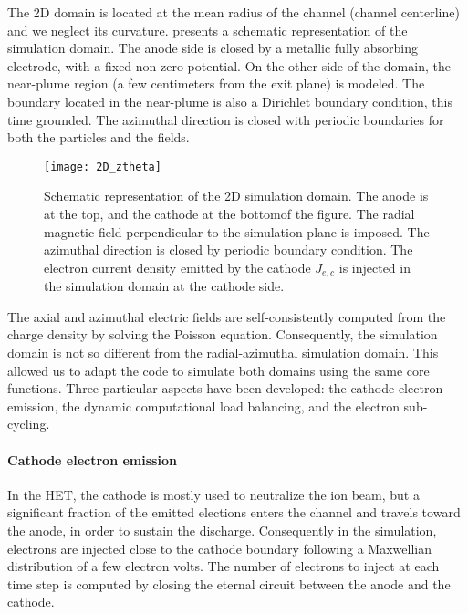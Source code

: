The \ac{2D} \ztheta domain is located at the mean radius of the channel (channel centerline) and we neglect its curvature.
 presents a schematic representation of the \ztheta simulation domain.
The anode side is closed by a metallic fully absorbing electrode, with a fixed non-zero potential.
On the other side of the domain, the near-plume region (a few centimeters from the exit plane) is modeled.
The boundary located in the near-plume is also a Dirichlet boundary condition, this time grounded.
The azimuthal direction is closed with periodic boundaries for both the particles and the fields.

\begin{figure}[hbt]
  \centering
  \texttt{[image: 2D\_ztheta]}
  \caption{Schematic representation of the \acs{2D} \ztheta simulation domain. The anode is at the top, and the cathode at the bottomof the figure. The radial magnetic field perpendicular to the simulation plane is imposed. The azimuthal direction is closed by periodic boundary condition. The electron current density emitted by the cathode $J_{e,c}$ is injected in the simulation domain at the cathode side. }
  \label{fig-2D_ztheta_bis}
\end{figure}

The axial and azimuthal electric fields are self-consistently computed from the charge density by solving the Poisson equation.
Consequently, the simulation domain is not so different from the radial-azimuthal simulation domain.
This allowed us to adapt the code \LPPic to simulate both domains using the same core functions.
Three particular aspects have been developed\string: the cathode electron emission, the dynamic computational load balancing, and the electron sub-cycling.

\paragraph{Cathode electron emission\\}
In the \ac{HET},  the cathode is mostly used to neutralize the ion beam, but a significant fraction of the emitted elections enters the channel and travels toward the anode, in order to sustain the discharge.
Consequently in the simulation, electrons are injected close to the cathode boundary following a Maxwellian distribution of a few electron volts.
The number of electrons to inject at each time step is computed by closing the eternal circuit between the anode and the cathode.

